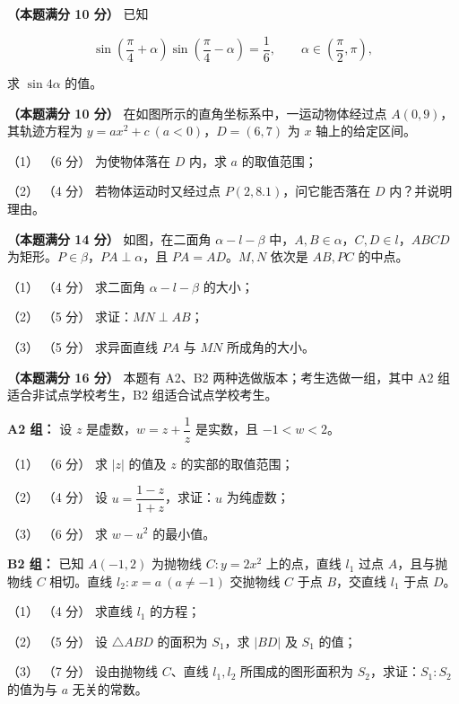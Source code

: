 \begin{question}
\textbf{（本题满分 10 分）} 已知

\nopagebreak[4]
\[
\sin\left(\dfrac{\pi}{4}+\alpha\right)\sin\left(\dfrac{\pi}{4}-\alpha\right)=\dfrac16,
\qquad \alpha\in\left(\dfrac\pi2,\pi\right),
\]

求 $\sin4\alpha$ 的值。

\Needspace{0.4\textheight}
\end{question}
\begin{question}
\textbf{（本题满分 10 分）} 在如图所示的直角坐标系中，一运动物体经过点 $A(0,9)$，其轨迹方程为 $y=ax^2+c\ (a<0)$，$D=(6,7)$ 为 $x$ 轴上的给定区间。

（1） （6 分） 为使物体落在 $D$ 内，求 $a$ 的取值范围；

（2） （4 分） 若物体运动时又经过点 $P(2,8.1)$，问它能否落在 $D$ 内？并说明理由。
\nopagebreak[4]
\begin{center}\end{center}
\nopagebreak[4]
\Needspace{0.4\textheight}
\end{question}
\begin{question}
\textbf{（本题满分 14 分）} 如图，在二面角 $\alpha-l-\beta$ 中，$A,B\in\alpha$，$C,D\in l$，$ABCD$ 为矩形。$P\in\beta$，$PA\perp\alpha$，且 $PA=AD$。$M,N$ 依次是 $AB,PC$ 的中点。

（1） （4 分） 求二面角 $\alpha-l-\beta$ 的大小；

（2） （5 分） 求证：$MN\perp AB$；

（3） （5 分） 求异面直线 $PA$ 与 $MN$ 所成角的大小。
\nopagebreak[4]
\begin{center}\end{center}
\nopagebreak[4]
\end{question}
\begin{question}
\textbf{（本题满分 16 分）} 本题有 A2、B2 两种选做版本；考生选做一组，其中 A2 组适合非试点学校考生，B2 组适合试点学校考生。

\textbf{A2 组：} 设 $z$ 是虚数，$w=z+\dfrac1z$ 是实数，且 $-1<w<2$。

（1） （6 分） 求 $|z|$ 的值及 $z$ 的实部的取值范围；

（2） （4 分） 设 $u=\dfrac{1-z}{1+z}$，求证：$u$ 为纯虚数；

（3） （6 分） 求 $w-u^2$ 的最小值。

\textbf{B2 组：} 已知 $A(-1,2)$ 为抛物线 $C:y=2x^2$ 上的点，直线 $l_1$ 过点 $A$，且与抛物线 $C$ 相切。直线 $l_2:x=a\ (a\ne-1)$ 交抛物线 $C$ 于点 $B$，交直线 $l_1$ 于点 $D$。

（1） （4 分） 求直线 $l_1$ 的方程；

（2） （5 分） 设 $\triangle ABD$ 的面积为 $S_1$，求 $|BD|$ 及 $S_1$ 的值；

（3） （7 分） 设由抛物线 $C$、直线 $l_1,l_2$ 所围成的图形面积为 $S_2$，求证：$S_1:S_2$ 的值为与 $a$ 无关的常数。

\Needspace{0.4\textheight}
\end{question}
